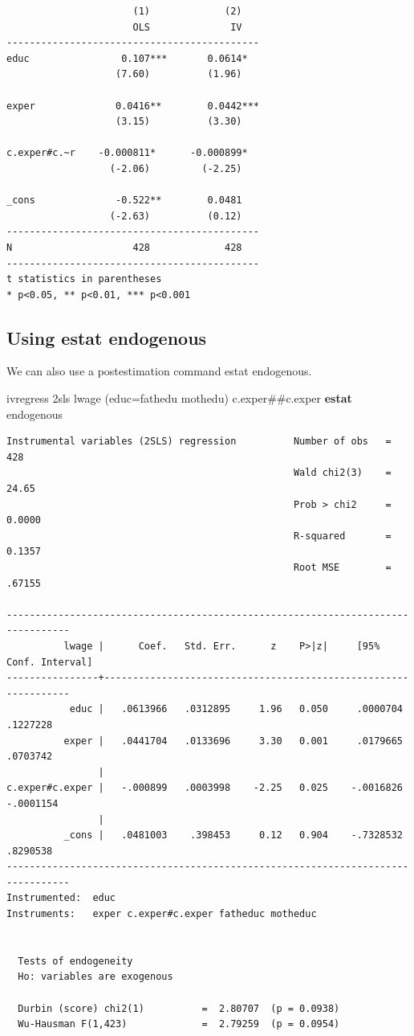 \documentclass[
]{book}
\newenvironment{Shaded}{\begin{snugshade}}{\end{snugshade}}
\newcommand{\KeywordTok}[1]{\textcolor[rgb]{0.13,0.29,0.53}{\textbf{#1}}}
\newcommand{\NormalTok}[1]{#1}
\begin{document}
\begin{verbatim}
                      (1)             (2)   
                      OLS              IV   
--------------------------------------------
educ                0.107***       0.0614*  
                   (7.60)          (1.96)   

exper              0.0416**        0.0442***
                   (3.15)          (3.30)   

c.exper#c.~r    -0.000811*      -0.000899*  
                  (-2.06)         (-2.25)   

_cons              -0.522**        0.0481   
                  (-2.63)          (0.12)   
--------------------------------------------
N                     428             428   
--------------------------------------------
t statistics in parentheses
* p<0.05, ** p<0.01, *** p<0.001
\end{verbatim}

\subsection{Using estat endogenous}\label{using-estat-endogenous}

We can also use a postestimation command estat endogenous.

\begin{Shaded}
\begin{Highlighting}[]
\NormalTok{ivregress 2sls lwage (educ=fathedu mothedu) c.exper\#\#c.exper}
\KeywordTok{estat}\NormalTok{ endogenous}
\end{Highlighting}
\end{Shaded}

\begin{verbatim}
Instrumental variables (2SLS) regression          Number of obs   =        428
                                                  Wald chi2(3)    =      24.65
                                                  Prob > chi2     =     0.0000
                                                  R-squared       =     0.1357
                                                  Root MSE        =     .67155

---------------------------------------------------------------------------------
          lwage |      Coef.   Std. Err.      z    P>|z|     [95% Conf. Interval]
----------------+----------------------------------------------------------------
           educ |   .0613966   .0312895     1.96   0.050     .0000704    .1227228
          exper |   .0441704   .0133696     3.30   0.001     .0179665    .0703742
                |
c.exper#c.exper |   -.000899   .0003998    -2.25   0.025    -.0016826   -.0001154
                |
          _cons |   .0481003    .398453     0.12   0.904    -.7328532    .8290538
---------------------------------------------------------------------------------
Instrumented:  educ
Instruments:   exper c.exper#c.exper fatheduc motheduc


  Tests of endogeneity
  Ho: variables are exogenous

  Durbin (score) chi2(1)          =  2.80707  (p = 0.0938)
  Wu-Hausman F(1,423)             =  2.79259  (p = 0.0954)
\end{verbatim}
\end{document}
